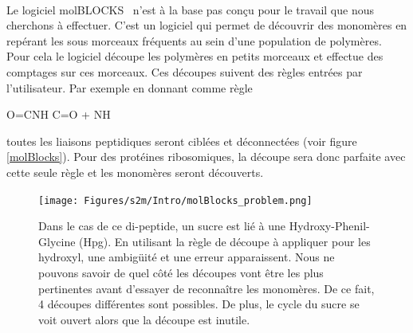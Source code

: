 \documentclass[12pt,french,twoside]{report}
\begin{document}
\paragraph{}Le logiciel molBLOCKS~\cite{ghersi_molblocks:_2014} n'est à la base pas conçu pour le travail que nous cherchons à effectuer.
C'est un logiciel qui permet de découvrir des monomères en repérant les sous morceaux fréquents au sein d'une population de polymères.
Pour cela le logiciel découpe les polymères en petits morceaux et effectue des comptages sur ces morceaux.
Ces découpes suivent des règles entrées par l'utilisateur.
Par exemple en donnant comme règle
\begin{chemmath}
  O=CNH \longrightarrow C=O + NH
\end{chemmath}
toutes les liaisons peptidiques seront ciblées et déconnectées (voir figure \ref{molBlocks}).
Pour des protéines ribosomiques, la découpe sera donc parfaite avec cette seule règle et les monomères seront découverts.

\begin{figure}[!ht]
  \begin{center}
    \texttt{[image: Figures/s2m/Intro/molBlocks\_problem.png]}
    \caption{\label{molBlocks_problem}Dans le cas de ce di-peptide, un sucre est lié à une Hydroxy-Phenil-Glycine (Hpg).
    En utilisant la règle de découpe à appliquer pour les hydroxyl, une ambigüité et une erreur apparaissent.
    Nous ne pouvons savoir de quel côté les découpes vont être les plus pertinentes avant d'essayer de reconnaître les monomères.
    De ce fait, 4 découpes différentes sont possibles.
    De plus, le cycle du sucre se voit ouvert alors que la découpe est inutile.}
  \end{center}
\end{figure}
\end{document}
